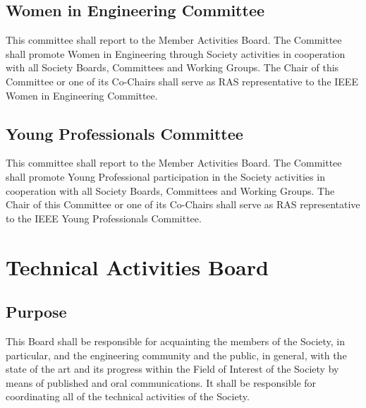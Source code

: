 \documentclass[10pt]{article}
\begin{document}
\subsection{Women in Engineering Committee}

This committee shall report to the Member Activities Board. The Committee shall promote Women in Engineering through Society activities in cooperation with all Society Boards, Committees and Working Groups. The Chair of this Committee or one of its Co-Chairs shall serve as RAS representative to the IEEE Women in Engineering Committee.


\subsection{Young Professionals Committee}

This committee shall report to the Member Activities Board. The Committee shall promote Young Professional participation in the Society activities in cooperation with all Society Boards, Committees and Working Groups. The Chair of this Committee or one of its Co-Chairs shall serve as RAS representative to the IEEE Young Professionals Committee.




\section{Technical Activities Board}
\label{TAB}

\subsection{Purpose}

This Board shall be responsible for acquainting the members of the Society, in particular, and the engineering community and the public, in general, with the state of the art and its progress within the Field of Interest of the Society by means of published and oral communications. It shall be responsible for coordinating all of the technical activities of the Society.
\end{document}
